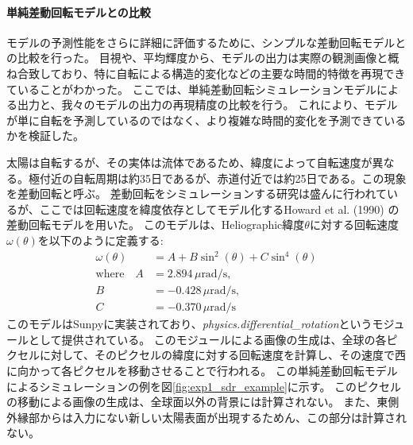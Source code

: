         \paragraph{単純差動回転モデルとの比較}
          モデルの予測性能をさらに詳細に評価するために、シンプルな差動回転モデルとの比較を行った。
          目視や、平均輝度から、モデルの出力は実際の観測画像と概ね合致しており、特に自転による構造的変化などの主要な時間的特徴を再現できていることがわかった。
          ここでは、単純差動回転シミュレーションモデルによる出力と、我々のモデルの出力の再現精度の比較を行う。
          これにより、モデルが単に自転を予測しているのではなく、より複雑な時間的変化を予測できているかを検証した。

          太陽は自転するが、その実体は流体であるため、緯度によって自転速度が異なる。極付近の自転周期は約35日であるが、赤道付近では約25日である。この現象を差動回転と呼ぶ。
          差動回転をシミュレーションする研究は盛んに行われているが、ここでは回転速度を緯度依存としてモデル化するHoward et al. (1990) \cite{howard1990solar}の差動回転モデルを用いた。
          このモデルは、Heliographic緯度\(\theta\)に対する回転速度\(\omega(\theta)\)を以下のように定義する:
          \begin{align}
            \omega(\theta) &= A + B \sin^{2}(\theta) + C \sin^{4}(\theta) \\
            \text{where} \quad A &= 2.894 \, \mu\text{rad/s}, \\
            B &= -0.428 \, \mu\text{rad/s}, \\
            C &= -0.370 \, \mu\text{rad/s}
          \end{align}
          このモデルはSunpyに実装されており、\textit{physics.differential\_rotation}というモジュールとして提供されている。
          このモジュールによる画像の生成は、全球の各ピクセルに対して、そのピクセルの緯度に対する回転速度を計算し、その速度で西に向かって各ピクセルを移動させることで行われる。
          この単純差動回転モデルによるシミュレーションの例を図\ref{fig:exp1_sdr_example}に示す。
          このピクセルの移動による画像の生成は、全球面以外の背景には計算されない。
          また、東側外縁部からは入力にない新しい太陽表面が出現するためん、この部分は計算されない。

